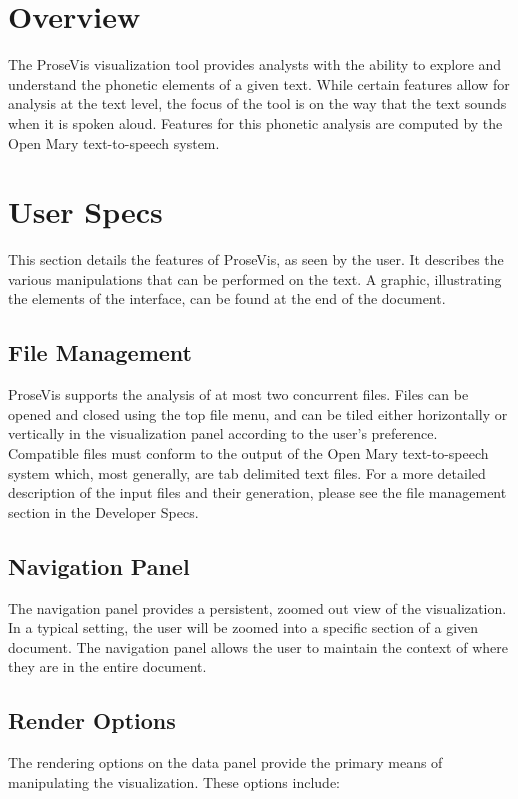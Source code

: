 \documentclass[fleqn]{article}
\begin{document}

\section{Overview}

The ProseVis visualization tool provides analysts with the ability to explore and understand the phonetic elements of a given text.  While certain features allow for analysis at the text level, the focus of the tool is on the way that the text sounds when it is spoken aloud.  Features for this phonetic analysis are computed by the Open Mary text-to-speech system.  

\section{User Specs}
This section details the features of ProseVis, as seen by the user.  It describes the various manipulations that can be performed on the text.  A graphic, illustrating the elements of the interface, can be found at the end of the document.

\subsection{File Management}
ProseVis supports the analysis of at most two concurrent files.  Files can be opened and closed using the top file menu, and can be tiled either horizontally or vertically in the visualization panel according to the user's preference.  Compatible files must conform to the output of the Open Mary text-to-speech system which, most generally, are tab delimited text files.  For a more detailed description of the input files and their generation, please see the file management section in the Developer Specs.

\subsection{Navigation Panel}
The navigation panel provides a persistent, zoomed out view of the visualization.  In a typical setting, the user will be zoomed into a specific section of a given document.  The navigation panel allows the user to maintain the context of where they are in the entire document.

\subsection{Render Options}
The rendering options on the data panel provide the primary means of manipulating the visualization.  These options include:
\end{document}
